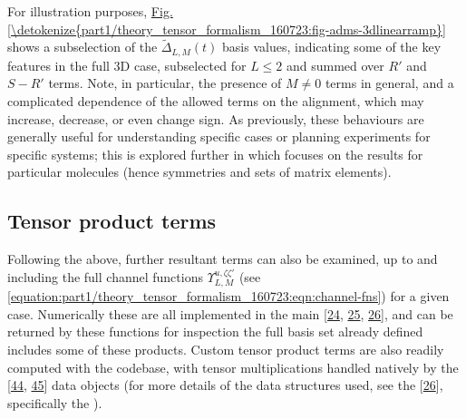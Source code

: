 \documentclass[letterpaper,table,10pt,english]{jupyterBook}
\begin{document}
\sphinxAtStartPar
For illustration purposes, \hyperref[\detokenize{part1/theory_tensor_formalism_160723:fig-adms-3dlinearramp}]{Fig.\@ \ref{\detokenize{part1/theory_tensor_formalism_160723:fig-adms-3dlinearramp}}} shows a subselection of the \(\tilde{\Delta}_{L,M}(t)\) basis values, indicating some of the key features in the full 3D case, subselected for \(L\leq2\) and summed over \(R'\) and \(S-R'\) terms. Note, in particular, the presence of \(M\neq0\) terms in general, and a complicated dependence of the allowed terms on the alignment, which may increase, decrease, or even change sign. As previously, these behaviours are generally useful for understanding specific cases or planning experiments for specific systems; this is explored further in {\hyperref[\detokenize{part2/extracting_matrix_elements_overview_270423:chpt-extracting-matrix-elements-overview}]{}} which focuses on the results for particular molecules (hence symmetries and sets of matrix elements).


\subsection{Tensor product terms}
\label{\detokenize{part1/theory_tensor_formalism_160723:tensor-product-terms}}\label{\detokenize{part1/theory_tensor_formalism_160723:sec-theory-tensor-products}}
\sphinxAtStartPar
Following the above, further resultant terms can also be examined, up to and including the full channel functions \(\varUpsilon_{L,M}^{u,\zeta\zeta'}\) (see \eqref{equation:part1/theory_tensor_formalism_160723:eqn:channel-fns}) for a given case. Numerically these are all implemented in the main  {[}\hyperlink{cite.backmatter/bibliography:id655}{24}, \hyperlink{cite.backmatter/bibliography:id597}{25}, \hyperlink{cite.backmatter/bibliography:id595}{26}{]}, and can be returned by these functions for inspection \sphinxhyphen{} the full basis set already defined includes some of these products. Custom tensor product terms are also readily computed with the codebase, with tensor multiplications handled natively by the  {[}\hyperlink{cite.backmatter/bibliography:id681}{44}, \hyperlink{cite.backmatter/bibliography:id953}{45}{]} data objects (for more details of the data structures used, see the  {[}\hyperlink{cite.backmatter/bibliography:id595}{26}{]}, specifically the ).
\end{document}
